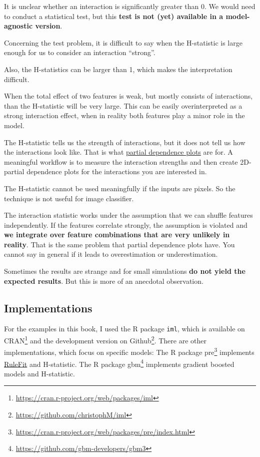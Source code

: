 \documentclass[
  12pt,
]{krantz}
\renewcommand{\href}[2]{#2\footnote{\url{#1}}}
\begin{document}
It is unclear whether an interaction is significantly greater than 0.
We would need to conduct a statistical test, but this \textbf{test is not (yet) available in a model-agnostic version}.

Concerning the test problem, it is difficult to say when the H-statistic is large enough for us to consider an interaction ``strong''.

Also, the H-statistics can be larger than 1, which makes the interpretation difficult.

When the total effect of two features is weak, but mostly consists of interactions, than the H-statistic will be very large.
This can be easily overinterpreted as a strong interaction effect, when in reality both features play a minor role in the model.

The H-statistic tells us the strength of interactions, but it does not tell us how the interactions look like.
That is what \protect\hyperlink{pdp}{partial dependence plots} are for.
A meaningful workflow is to measure the interaction strengths and then create 2D-partial dependence plots for the interactions you are interested in.

The H-statistic cannot be used meaningfully if the inputs are pixels.
So the technique is not useful for image classifier.

The interaction statistic works under the assumption that we can shuffle features independently.
If the features correlate strongly, the assumption is violated and \textbf{we integrate over feature combinations that are very unlikely in reality}.
That is the same problem that partial dependence plots have.
You cannot say in general if it leads to overestimation or underestimation.

Sometimes the results are strange and for small simulations \textbf{do not yield the expected results}.
But this is more of an anecdotal observation.

\hypertarget{implementations}{%
\subsection{Implementations}\label{implementations}}

For the examples in this book, I used the R package \texttt{iml}, which is available on \href{https://cran.r-project.org/web/packages/iml}{CRAN} and the development version on \href{https://github.com/christophM/iml}{Github}.
There are other implementations, which focus on specific models:
The R package \href{https://cran.r-project.org/web/packages/pre/index.html}{pre} implements \protect\hyperlink{rulefit}{RuleFit} and H-statistic.
The R package \href{https://github.com/gbm-developers/gbm3}{gbm} implements gradient boosted models and H-statistic.
\end{document}
